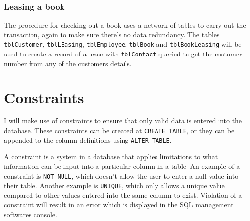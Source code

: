 \documentclass[11pt,a4paper]{scrartcl}
\begin{document}
	\subsubsection*{Leasing a book}
	
	The procedure for checking out a book uses a network of tables to carry out the transaction, again to make sure there's no data redundancy. The tables \texttt{tblCustomer}, \texttt{tblLEasing}, \texttt{tblEmployee}, \texttt{tblBook} and \texttt{tblBookLeasing} will be used to create a record of a lease with \texttt{tblContact} queried to get the customer number from any of the customers details.
	
	\section{Constraints}
	
	I will make use of constraints to ensure that only valid data is entered into the database. These constraints can be created at \texttt{CREATE TABLE}, or they can be appended to the column definitions using \texttt{ALTER TABLE}.
	
	A constraint is a system in a database that applies limitations to what information can be input into a particular column in a table. An example of a constraint is \texttt{NOT NULL}, which doesn't allow the user to enter a null value into their table. Another example is \texttt{UNIQUE}, which only allows a unique value compared to other values entered into the same column to exist. Violation of a constraint will result in an error which is displayed in the SQL management softwares console.
	
	
\end{document}
